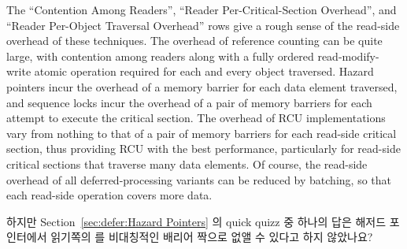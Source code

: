 The ``Contention Among Readers'', ``Reader Per-Critical-Section Overhead'',
and ``Reader Per-Object Traversal Overhead'' rows give a rough sense of
the read-side overhead of these techniques.
The overhead of reference counting can be quite large, with
contention among readers along with a fully ordered read-modify-write
atomic operation required for each and every object traversed.
Hazard pointers incur the overhead of a memory barrier for each data element
traversed, and sequence locks incur the overhead of a pair of memory barriers
for each attempt to execute the critical section.
The overhead of RCU implementations vary from nothing to that of a pair of
memory barriers for each read-side critical section, thus providing RCU
with the best performance, particularly for read-side critical sections
that traverse many data elements.
Of course, the read-side overhead of all deferred-processing variants can
be reduced by batching, so that each read-side operation covers more data.
\fi

\QuickQuiz{}
	하지만 Section~\ref{sec:defer:Hazard Pointers}
	의 quick quizz 중 하나의 답은 해저드 포인터에서 읽기쪽의 
	를 비대칭적인 배리어 짝으로 없앨 수 있다고 하지 않았나요?
	\iffalse

